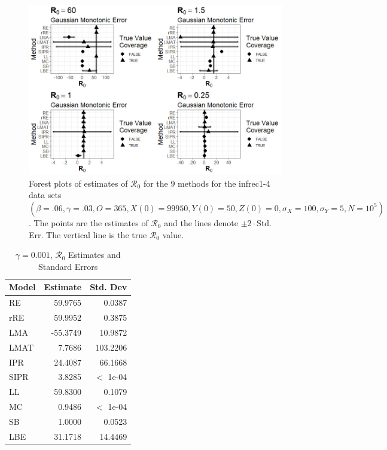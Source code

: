 \documentclass[12pt]{article}
\newcommand{\xxsir}{\ensuremath{9} } %
\newcommand{\rr}{\ensuremath{\mathcal{R}_0}}
\begin{document}
\begin{figure}[H]
	\centering
	\includegraphics[scale=0.5]{images/parchange_nm.jpg}
	\caption{Forest plots of estimates of $\rr$ for the \xxsir methods for the infrec1-4 data sets $(\beta=.06, \gamma=.03, O=365, X(0)=99950, Y(0)=50, Z(0)=0, \sigma_X=100, \sigma_Y=5, N=10^5)$.  The points are the estimates of $\rr$ and the lines denote $\pm 2\cdot $Std. Err.  The vertical line is the true $\rr$ value.}
\end{figure}
\begin{table}[H]
	
	\centering
	\begin{tabular}[t]{l|r|r}
		\hline
		Model & Estimate & Std. Dev\\
		\hline
		RE & 59.9765 & 0.0387\\
		\hline
		rRE & 59.9952 & 0.3875\\
		\hline
		LMA & -55.3749 & 10.9872\\
		\hline
		LMAT & 7.7686 & 103.2206\\
		\hline
		IPR & 24.4087 & 66.1668\\
		\hline
		SIPR & 3.8285 & $<$ 1e-04\\
		\hline
		LL & 59.8300 & 0.1079\\
		\hline
		MC & 0.9486 & $<$ 1e-04\\
		\hline
		SB & 1.0000 & 0.0523\\
		\hline
		LBE & 31.1718 & 14.4469\\
		\hline
	\end{tabular}
	\caption{$\gamma = 0.001$, $\rr$ Estimates and Standard Errors}
\end{table}
\end{document}
